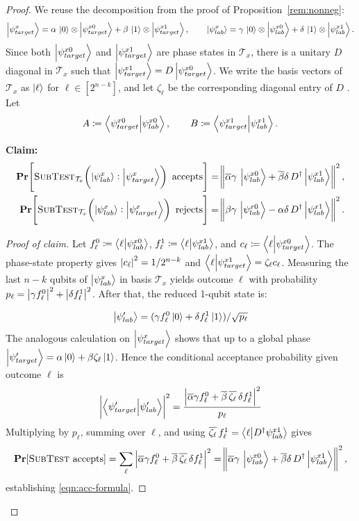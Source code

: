 \begin{proof}
We reuse the decomposition from the proof of Proposition~\ref{rem:nonneg}:
\[
    \ket{\psi_{target}^x} = \alpha\,\ket{0}\otimes\ket{\psi_{target}^{x0}} + \beta\,\ket{1}\otimes\ket{\psi_{target}^{x1}}, \qquad
    \ket{\psi_{lab}^x} = \gamma\,\ket{0}\otimes\ket{\psi_{lab}^{x0}} + \delta\,\ket{1}\otimes\ket{\psi_{lab}^{x1}}.
\]
Since both $\ket{\psi_{target}^{x0}}$ and $\ket{\psi_{target}^{x1}}$ are phase states in $\mathcal{T}_x$, there is a unitary $D$ diagonal in $\mathcal{T}_x$ such that $\ket{\psi_{target}^{x1}} = D\ket{\psi_{target}^{x0}}$. We write the basis vectors of $\mathcal{T}_x$ as $\ket{\ell}$ for $\ell \in [2^{n-k}]$, 
and let $\zeta_\ell$ be the corresponding diagonal entry of $D$ . Let
\[
    A \coloneqq \braket{\psi_{target}^{x0}}{\psi_{lab}^{x0}}, \qquad B \coloneqq \braket{\psi_{target}^{x1}}{\psi_{lab}^{x1}}.
\]

\medskip
\noindent \textbf{Claim:}
\begin{align}
    \operatorname{{\bf Pr}}\!\left[\textsc{SubTest}_{\mathcal{T}_x}\!\left(\ket{\psi_{lab}^x}:\ket{\psi_{target}^x}\right) \text{ accepts}\right]
        &= \norm{\overline{\alpha}\gamma\,\ket{\psi_{lab}^{x0}} + \overline{\beta}\delta\,D^\dagger\ket{\psi_{lab}^{x1}}}^2, \label{eqn:acc-formula}\\
    \operatorname{{\bf Pr}}\!\left[\textsc{SubTest}_{\mathcal{T}_x}\!\left(\ket{\psi_{lab}^x}:\ket{\psi_{target}^x}\right) \text{ rejects}\right]
        &= \norm{\beta\gamma\,\ket{\psi_{lab}^{x0}} - \alpha\delta\,D^\dagger\ket{\psi_{lab}^{x1}}}^2. \label{eqn:rej-formula}
\end{align}

\begin{proof}[Proof of claim]
Let $f^0_\ell \coloneqq \braket{\ell}{\psi_{lab}^{x0}}$, $f^1_\ell \coloneqq \braket{\ell}{\psi_{lab}^{x1}}$, and $c_\ell \coloneqq \braket{\ell}{\psi_{target}^{x0}}$. The phase-state property gives ${\left| c_\ell \right|}^2 = 1/2^{n-k}$ and $\braket{\ell}{\psi_{target}^{x1}} = \zeta_\ell c_\ell$. Measuring the last $n-k$ qubits of $\ket{\psi_{lab}^x}$ in basis $\mathcal{T}_x$ yields outcome $\ell$ with probability $p_\ell = {\left| \gamma f^0_\ell \right|}^2 + {\left| \delta f^1_\ell \right|}^2$. 
After that, the reduced 1-qubit state is: 

\[
\ket{\psi_{lab}'} = (\gamma f^0_\ell\ket{0} + \delta f^1_\ell\ket{1})/\sqrt{p_\ell}
\]
The analogous calculation on $\ket{\psi_{target}^x}$ 
shows that up to a global phase $\ket{\psi_{target}'} = \alpha\ket{0} + \beta\zeta_\ell\ket{1}$.
Hence the conditional acceptance probability given outcome $\ell$ is
\[
    {\left| \braket{\psi_{target}'}{\psi_{lab}'} \right|}^2 = \frac{{\left| \overline{\alpha}\gamma f^0_\ell + \overline{\beta}\,\overline{\zeta_\ell}\,\delta f^1_\ell \right|}^2}{p_\ell}
\]
Multiplying by $p_\ell$, summing over $\ell$, 
and using $\overline{\zeta_\ell}\,f^1_\ell = \braket{\ell}{D^\dagger\psi_{lab}^{x1}}$ gives
\[
    \operatorname{{\bf Pr}}[\textsc{SubTest}\text{ accepts}] = \sum_\ell {\left| \overline{\alpha}\gamma f^0_\ell + \overline{\beta}\,\overline{\zeta_\ell}\,\delta f^1_\ell \right|}^2 = \norm{\overline{\alpha}\gamma\,\ket{\psi_{lab}^{x0}} + \overline{\beta}\delta\,D^\dagger\ket{\psi_{lab}^{x1}}}^2,
\]
establishing \eqref{eqn:acc-formula}.


\end{proof}
\end{proof}
